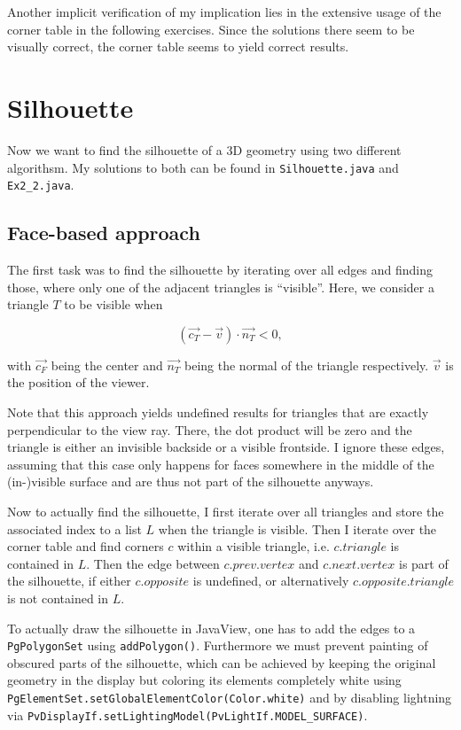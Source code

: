 \documentclass[a4paper,10pt,notitlepage]{scrreprt}
\begin{document}
Another implicit verification of my implication lies in the extensive usage of
the corner table in the following exercises. Since the solutions there seem to
be visually correct, the corner table seems to yield correct results.

\chapter{Silhouette}

Now we want to find the silhouette of a 3D geometry using two different
algorithsm. My solutions to both can be found in \texttt{Silhouette.java} and
\texttt{Ex2\_2.java}.

\section{Face-based approach}

The first task was to find the silhouette by iterating over all edges and
finding those, where only one of the adjacent triangles is ``visible''. Here, we
consider a triangle $T$ to be visible when

\begin{equation}
 (\vec{c_T} - \vec{v}) \cdot \vec{n_T} < 0,
\end{equation}

with $\vec{c_F}$ being the center and $\vec{n_T}$ being the normal of the
triangle respectively. $\vec{v}$ is the position of the viewer.

Note that this approach yields undefined results for triangles that are
exactly perpendicular to the view ray. There, the dot product will be zero and
the triangle is either an invisible backside or a visible frontside. I ignore
these edges, assuming that this case only happens for faces somewhere in the
middle of the (in-)visible surface and are thus not part of the silhouette
anyways.

Now to actually find the silhouette, I first iterate over all triangles and
store the associated index to a list $L$ when the triangle is visible. Then
I iterate over the corner table and find corners $c$ within a visible triangle,
i.e. $c.triangle$ is contained in $L$. Then the edge between $c.prev.vertex$
and $c.next.vertex$ is part of the silhouette, if either $c.opposite$ is
undefined, or alternatively $c.opposite.triangle$ is not contained in $L$.

To actually draw the silhouette in JavaView, one has to add the edges to a
\texttt{PgPolygonSet} using \texttt{addPolygon()}. Furthermore we must prevent
painting of obscured parts of the silhouette, which can be achieved by
keeping the original geometry in the display but coloring its elements
completely white using
\texttt{PgElementSet.setGlobalElementColor(Color.white)} and by disabling
lightning via 
\texttt{PvDisplayIf.setLightingModel(PvLightIf.MODEL\_SURFACE)}.
\end{document}
